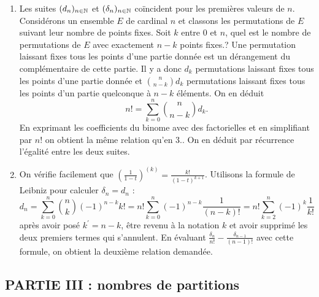 \begin{enumerate}
\item  Les suites $(d_{n})_{n\in \mathbb{N}}$ et $(\delta _{n})_{n\in \mathbb{N}}$ co\"{i}ncident pour les premi{\`e}res valeurs de $n$.
Consid{\'e}rons un ensemble $E$ de cardinal $n$ et classons les permutations de $E$ suivant leur nombre de points fixes.\newline
Soit $k$ entre $0$ et $n$, quel est le nombre de permutations de $E$ avec exactement $n-k$ points fixes.?\newline
Une permutation laissant fixes tous les points d'une partie donn{\'e}e est un d{\'e}rangement du compl{\'e}mentaire de cette partie. Il y a donc $d_{k}$
permutations laissant fixes tous les points d'une partie donn{\'e}e et $\binom{n}{n-k}d_{k}$ permutations laissant fixes tous les points d'un partie
quelconque {\`a} $n-k$ {\'e}l{\'e}ments. On en d{\'e}duit
\[
n!=\sum_{k=0}^{n}\binom{n}{n-k}d_{k}.
\]
En exprimant les coefficients du binome avec des factorielles et en simplifiant par $n!$ on obtient la m{\^e}me relation qu'en 3.. On en
d{\'e}duit par r{\'e}currence l'{\'e}galit{\'e} entre les deux suites.

\item  On v{\'e}rifie facilement que $(\frac{1}{1-t})^{(k)}=\frac{k!}{(1-t)^{k+1}}$. Utilisons la formule de Leibniz pour calculer $\delta
_{n}=d_{n}$ :
\[
d_{n}=\sum_{k=0}^{n}\binom{n}{k}(-1)^{n-k}k!=n!\sum_{k=0}^{n}(-1)^{n-k}\frac{1}{(n-k)!}=n!\sum_{k=2}^{n}(-1)^{k}\frac{1}{k!}
\]
apr{\`e}s avoir pos{\'e} $k^{\prime }=n-k$, {\^e}tre revenu {\`a} la notation $k$ et avoir supprim{\'e} les deux premiers termes qui s'annulent.\newline
En {\'e}valuant $\frac{\delta _{n}}{n!}-\frac{\delta _{n-1}}{(n-1)!}$ avec cette formule, on obtient la deuxi{\`e}me relation demand{\'e}e.
\end{enumerate}

\subsection*{PARTIE III : nombres de partitions}

